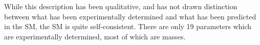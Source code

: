 
While this description has been qualitative, and has not drawn distinction between what has been experimentally determined and what has been predicted in the SM, the SM is quite self-consistent. There are only 19 parameters which are experimentally determined, most of which are masses.




